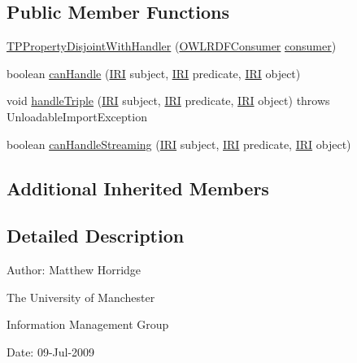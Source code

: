\subsection*{Public Member Functions}
\begin{DoxyCompactItemize}
\item 
\hyperlink{classorg_1_1coode_1_1owlapi_1_1rdfxml_1_1parser_1_1_t_p_property_disjoint_with_handler_aa246311397ae7962c79811b4f2a04f8c}{T\-P\-Property\-Disjoint\-With\-Handler} (\hyperlink{classorg_1_1coode_1_1owlapi_1_1rdfxml_1_1parser_1_1_o_w_l_r_d_f_consumer}{O\-W\-L\-R\-D\-F\-Consumer} \hyperlink{classorg_1_1coode_1_1owlapi_1_1rdfxml_1_1parser_1_1_abstract_triple_handler_a4ccf4d898ff01eb1cadfa04b23d54e9c}{consumer})
\item 
boolean \hyperlink{classorg_1_1coode_1_1owlapi_1_1rdfxml_1_1parser_1_1_t_p_property_disjoint_with_handler_af6e92eeb074849b1593b8c021116a2f2}{can\-Handle} (\hyperlink{classorg_1_1semanticweb_1_1owlapi_1_1model_1_1_i_r_i}{I\-R\-I} subject, \hyperlink{classorg_1_1semanticweb_1_1owlapi_1_1model_1_1_i_r_i}{I\-R\-I} predicate, \hyperlink{classorg_1_1semanticweb_1_1owlapi_1_1model_1_1_i_r_i}{I\-R\-I} object)
\item 
void \hyperlink{classorg_1_1coode_1_1owlapi_1_1rdfxml_1_1parser_1_1_t_p_property_disjoint_with_handler_a3a00be87cc27df2d564f88f267250e41}{handle\-Triple} (\hyperlink{classorg_1_1semanticweb_1_1owlapi_1_1model_1_1_i_r_i}{I\-R\-I} subject, \hyperlink{classorg_1_1semanticweb_1_1owlapi_1_1model_1_1_i_r_i}{I\-R\-I} predicate, \hyperlink{classorg_1_1semanticweb_1_1owlapi_1_1model_1_1_i_r_i}{I\-R\-I} object)  throws Unloadable\-Import\-Exception 
\item 
boolean \hyperlink{classorg_1_1coode_1_1owlapi_1_1rdfxml_1_1parser_1_1_t_p_property_disjoint_with_handler_a1b25d92bae491a8ced8750a0ea9d8a00}{can\-Handle\-Streaming} (\hyperlink{classorg_1_1semanticweb_1_1owlapi_1_1model_1_1_i_r_i}{I\-R\-I} subject, \hyperlink{classorg_1_1semanticweb_1_1owlapi_1_1model_1_1_i_r_i}{I\-R\-I} predicate, \hyperlink{classorg_1_1semanticweb_1_1owlapi_1_1model_1_1_i_r_i}{I\-R\-I} object)
\end{DoxyCompactItemize}
\subsection*{Additional Inherited Members}


\subsection{Detailed Description}
Author\-: Matthew Horridge\par
 The University of Manchester\par
 Information Management Group\par
 Date\-: 09-\/\-Jul-\/2009 

